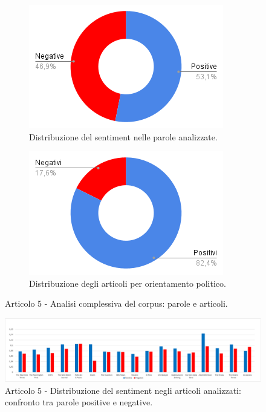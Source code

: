 \begin{figure}[H]
    \centering
    \begin{subfigure}[t]{0.48\textwidth}
        \centering
        \includegraphics[width=\linewidth]{Immagini//Articolo5/Articolo 5 - Rapporto Totale Parole.png}
        \caption{Distribuzione del sentiment nelle parole analizzate.}
        \label{fig:totale-parole-a5}
    \end{subfigure}
    \hfill
    \begin{subfigure}[t]{0.48\textwidth}
        \centering
        \includegraphics[width=\linewidth]{Immagini//Articolo5/Articolo 5 - Rapporto Totale Articoli.png}
        \caption{Distribuzione degli articoli per orientamento politico.}
        \label{fig:totale-articoli-a5}
    \end{subfigure}
    \caption{Articolo 5 - Analisi complessiva del corpus: parole e articoli.}
    \label{fig:analisi-totale-a5}

    \centering
    \includegraphics[width=1\linewidth]{Immagini//Articolo5/Articolo 5 - Analisi Grafica Risultati Totali.png}
    \caption{Articolo 5 - Distribuzione del sentiment negli articoli analizzati: confronto tra parole positive e negative.}
    \label{fig:risultati-totali-a5}
\end{figure}
